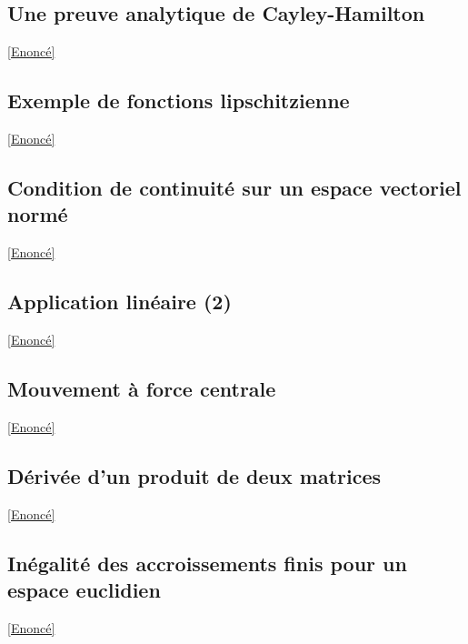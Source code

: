 \documentclass{book}
\begin{document}
	\subsection{Une preuve analytique de Cayley-Hamilton}
	\label{sec:une-preuve-analytique-de-cayley-hamilton}
	\textcolor{blue}{\hyperref[Une preuve analytique de Cayley-Hamilton]{[Enoncé]}}\\
	
	\subsection{Exemple de fonctions lipschitzienne}
	\label{sec:exemple-de-fonctions-lipschitzienne}
	\textcolor{blue}{\hyperref[Exemple de fonction lipschitzienne]{[Enoncé]}}\\
	
	\subsection{Condition de continuité sur un espace vectoriel normé}
	\label{sec:condition-de-continuite-sur-un-espace-vectoriel-norme}
	\textcolor{blue}{\hyperref[Condition de continuité sur un espace vecoriel normé]{[Enoncé]}}\\
	
	\subsection{Application linéaire (2)}
	\label{sec:application-lineaire-2}
	\textcolor{blue}{\hyperref[Application linéaire 2]{[Enoncé]}}\\
	
	\subsection{Mouvement à force centrale}
	\label{sec:mouvement-a-force-centrale}
	\textcolor{blue}{\hyperref[Mouvement à force centrale]{[Enoncé]}}\\
	
	\subsection{Dérivée d'un produit de deux matrices}
	\label{sec:derivee-dun-produit-de-deux-matrices}
	\textcolor{blue}{\hyperref[Dérivée d'un produit de deux matrices]{[Enoncé]}}\\
	
	\subsection{Inégalité des accroissements finis pour un espace euclidien}
	\label{sec:inegalite-des-accroissements-finis-pour-un-espace-euclidien}
	\textcolor{blue}{\hyperref[Inégalité des accroissements finis pour un espace euclidien]{[Enoncé]}}\\
\end{document}
